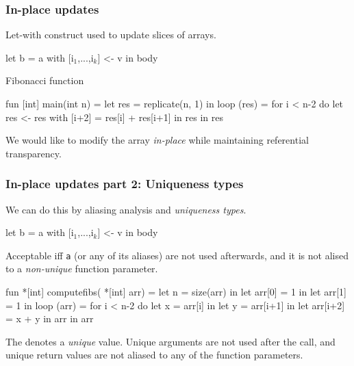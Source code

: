 \documentclass{beamer}
\newcommand{\emp}[1]{\textcolor{DikuRed}{ #1}}
\newcommand{\mymath}[1]{$ #1 $}
\newcommand{\myindx}[1]{_{#1}}
\begin{document}
\begin{frame}[fragile,t]
  \frametitle{In-place updates}

  Let-with construct used to update slices of arrays.

  \begin{colorcode}
    let b = a with [i\mymath{\myindx{1}},...,i\mymath{\myindx{k}}] <- v
    in body
  \end{colorcode}

  \pause

  \begin{block}{Fibonacci function}
    \begin{colorcode}
fun [int] main(int n) =
  let res = replicate(n, 1) in
  loop (res) = for i < n-2 do
    let res <- res with [i+2] = res[i] + res[i+1] in
    res
  in res
    \end{colorcode}
  \end{block}

  We would like to modify the array {\em in-place} while maintaining
  referential transparency.

\end{frame}

\begin{frame}[fragile,t]
  \frametitle{In-place updates part 2: Uniqueness types}

  We can do this by aliasing analysis and {\em uniqueness types}.

  \begin{colorcode}
    let b = a with [i\mymath{\myindx{1}},...,i\mymath{\myindx{k}}] <- v
    in body
  \end{colorcode}

  Acceptable iff {\tt a} (or any of its aliases) are not used
  afterwards, and it is not alised to a {\it non-unique} function
  parameter.

  \begin{colorcode}
    fun \emp{*}[int] computefibs(\emp{*}[int] arr) =
      let n = size(arr) in
      let arr[0] = 1 in
      let arr[1] = 1 in
      loop (arr) = for i < n-2 do
        let x = arr[i] in
        let y = arr[i+1] in
        let arr[i+2] = x + y in
        arr
      in arr
  \end{colorcode}

  The {\tt *} denotes a {\em unique} value.  Unique arguments are not
  used after the call, and unique return values are not aliased to any
  of the function parameters.

\end{frame}
\end{document}
